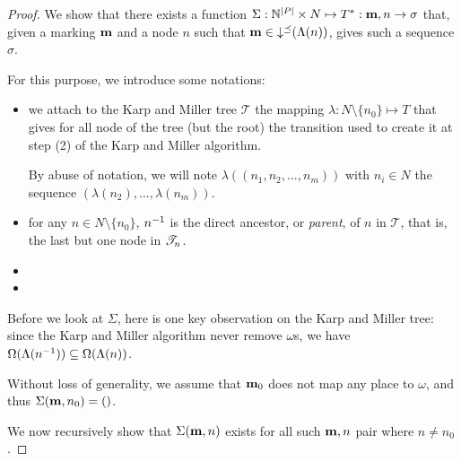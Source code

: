 \begin{proof}
  We show that there exists a function $\Sigma : \mathbb{N}^{|P|} \times N \mapsto T^* : \mathbf{m}, n \rightarrow \sigma$ that, given a marking $\mathbf{m}$ and a node $n$ such that $\mathbf{m} \in \operatorname{\downarrow^\preceq}(\Lambda(n))$, gives such a sequence $\sigma$.

  For this purpose, we introduce some notations:
  \begin{itemize}
    \item we attach to the Karp and Miller tree $\mathcal{T}$ the mapping $\lambda : N \setminus \{n_0\} \mapsto T$ that gives for all node of the tree (but the root) the transition used to create it at step (2) of the Karp and Miller algorithm.

      By abuse of notation, we will note $\lambda((n_1, n_2, ..., n_m))$
      with  $n_i \in N$
      the sequence $(\lambda(n_2), ..., \lambda(n_m))$.
    \item for any $n \in N \setminus \{n_0\}$, $n^{-1}$ is the direct ancestor, or \emph{parent}, of $n$ in $\mathcal{T}$, that is, the last but one node in $\mathscr{T}_{n}$.
    \item {}
    \item {}
  \end{itemize}

  Before we look at $\Sigma$, here is one key observation on the Karp and Miller tree:
  since the Karp and Miller algorithm never remove $\omega$s, we have
  $\Omega(\Lambda(n^{-1})) \subseteq \Omega(\Lambda(n))$.

  Without loss of generality, we assume that $\mathbf{m}_0$ does not map any place to $\omega$, and thus $\Sigma(\mathbf{m}, n_0) = ()$.

  We now recursively show that $\Sigma(\mathbf{m}, n)$ exists for all such $\mathbf{m}, n$ pair where $n \neq n_0$.


\end{proof}

